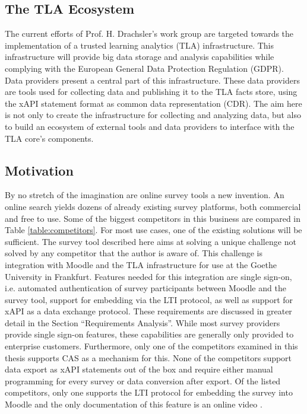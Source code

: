 

\subsection{The TLA Ecosystem}
    The current efforts of Prof. H. Drachsler's work group are targeted towards the implementation
    of a trusted learning analytics (TLA) infrastructure. This infrastructure will
    provide big data storage and analysis capabilities while complying with the European General
    Data Protection Regulation (GDPR). Data providers present a central part of this infrastructure.
    These data providers are tools used for collecting data and publishing it to
    the TLA facts store, using the xAPI statement format as common data representation (CDR).
    The aim here is not only to create the infrastructure for collecting and analyzing data,
    but also to build an ecosystem of external tools and data providers
    to interface with the TLA core's components.

\subsection{Motivation}
    By no stretch of the imagination are online survey tools a new invention.
    An online search yields dozens of already existing survey platforms, both
    commercial and free to use. Some of the biggest competitors in this business
    are compared in Table \ref{table:competitors}. For most use cases, one
    of the existing solutions will be sufficient. The survey tool described here
    aims at solving a unique challenge not solved by any competitor that the author
    is aware of. This challenge is integration with Moodle and the TLA
    infrastructure for use at the Goethe University in Frankfurt.
    Features needed for this integration are single sign-on, i.e.
    automated authentication of survey participants between Moodle and
    the survey tool, support for embedding via the LTI protocol, 
    as well as support for xAPI as a data exchange protocol.
    These requirements are discussed in greater detail in the Section
    ``Requirements Analysis''. While most survey providers provide single
    sign-on features, these capabilities are generally only provided to enterprise
    customers. Furthermore, only one of the competitors examined in this thesis
    supports CAS as a mechanism for this. None of the competitors
    support data export as xAPI statements out of the box and require either
    manual programming for every survey or data conversion after export. 
    Of the listed competitors, only one supports the LTI protocol for
    embedding the survey into Moodle and the only documentation of this 
    feature is an online video \cite{qualtrics-lti-video}.

